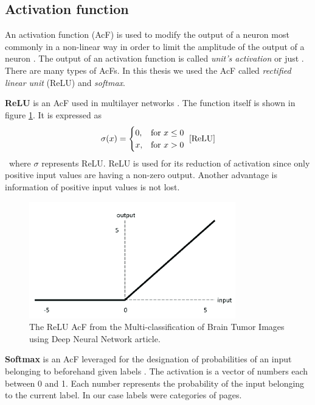 \subsection{Activation function}\label{activationFunction}
An activation function (AcF) is used to modify the output of a neuron most commonly in a non-linear way in order to limit the amplitude of the output of a neuron \cite{activationFunction}. The output of an activation function is called \textit{unit's activation} or just . There are many types of AcFs. In this thesis we used the AcF called \textit{rectified linear unit} (ReLU) and \textit{softmax}.

\textbf{ReLU} is an AcF used in multilayer networks \cite{ReLU}. The function itself is shown in figure \ref{reluImage}. It is expressed as 
\[\sigma(x)= \begin{cases}
    0, & \text{for } x\leq 0\\
    x, & \text{for } x > 0
\end{cases}~\cite{ReLU}\] ~where $\sigma$ represents ReLU. ReLU is used for its reduction of activation since only positive input values are having a non-zero output. Another advantage is information of positive input values is not lost.
\begin{figure}[ht!]
  \centering
  \includegraphics[width=0.8\textwidth]{Images/ReLUFunction.png}
  \caption{The ReLU AcF from the Multi-classification of Brain Tumor Images using Deep Neural Network \cite{reluImage} article.} 
  \label{reluImage}
\end{figure} 

\textbf{Softmax} is an AcF leveraged for the designation of probabilities of an input belonging to beforehand given labels \cite{machineLeraningApproaches}. The activation is a vector of numbers each between 0 and 1. Each number represents the probability of the input belonging to the current label.  In our case labels were categories of pages.

